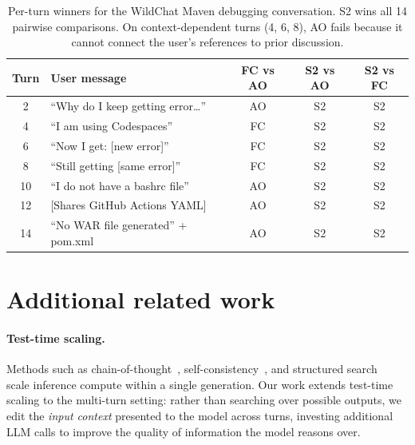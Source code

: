 \documentclass{article}
\begin{document}
\begin{table}[h]
\centering
\begin{tabular}{clccc}
\toprule
\textbf{Turn} & \textbf{User message} & \textbf{FC vs AO} & \textbf{S2 vs AO} & \textbf{S2 vs FC} \\
\midrule
2 & ``Why do I keep getting error\ldots'' & AO & S2 & S2 \\
4 & ``I am using Codespaces'' & FC & S2 & S2 \\
6 & ``Now I get: [new error]'' & FC & S2 & S2 \\
8 & ``Still getting [same error]'' & FC & S2 & S2 \\
10 & ``I do not have a bashrc file'' & AO & S2 & S2 \\
12 & [Shares GitHub Actions YAML] & AO & S2 & S2 \\
14 & ``No WAR file generated'' + pom.xml & AO & S2 & S2 \\
\bottomrule
\end{tabular}
\caption{Per-turn winners for the WildChat Maven debugging conversation. S2 wins all 14 pairwise comparisons. On context-dependent turns (4, 6, 8), AO fails because it cannot connect the user's references to prior discussion.}
\label{tab:traj-turns}
\end{table}


\section{Additional related work}
\label{app:additional-related}

\paragraph{Test-time scaling.}
Methods such as chain-of-thought~\citep{wei2022chain}, self-consistency~\citep{wang2023selfconsistency}, and structured search~\citep{yao2024tree} scale inference compute within a single generation. Our work extends test-time scaling to the multi-turn setting: rather than searching over possible outputs, we edit the \emph{input context} presented to the model across turns, investing additional LLM calls to improve the quality of information the model reasons over.
\end{document}

